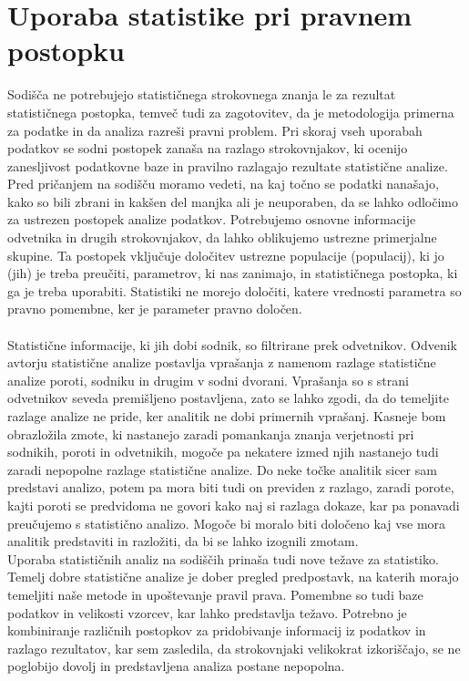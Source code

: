 \documentclass[12pt,a4paper]{amsart}
\theoremstyle{definition} %
\theoremstyle{plain} %
\begin{document}
\section{Uporaba statistike pri pravnem postopku}
Sodišča ne potrebujejo statističnega strokovnega znanja le za rezultat statističnega postopka, temveč tudi za zagotovitev, da je metodologija 
primerna za podatke in da analiza razreši pravni problem. Pri skoraj vseh uporabah podatkov se sodni postopek zanaša na razlago 
strokovnjakov, ki ocenijo zanesljivost podatkovne baze in pravilno razlagajo rezultate statistične analize. Pred pričanjem na sodišču moramo vedeti, 
na kaj točno se podatki nanašajo, kako so bili zbrani in kakšen del manjka ali je neuporaben, da se lahko odločimo za ustrezen postopek analize podatkov.
Potrebujemo osnovne informacije odvetnika in drugih strokovnjakov, da lahko oblikujemo ustrezne primerjalne skupine. Ta postopek vključuje 
določitev ustrezne populacije (populacij), ki jo (jih) je treba preučiti, parametrov, ki nas zanimajo, in statističnega postopka, ki ga je treba uporabiti. 
Statistiki ne morejo določiti, katere vrednosti parametra so pravno pomembne, ker je parameter pravno določen.\\\\
Statistične informacije, ki jih dobi sodnik, so filtrirane prek odvetnikov. Odvenik avtorju statistične analize postavlja vprašanja z namenom razlage 
statistične analize poroti, sodniku in drugim v sodni dvorani. Vprašanja so s strani odvetnikov seveda premišljeno postavljena, zato se lahko zgodi, da do 
temeljite razlage analize ne pride, ker analitik ne dobi primernih vprašanj. Kasneje bom obrazložila zmote, ki nastanejo zaradi pomankanja znanja verjetnosti 
pri sodnikih, poroti in odvetnikih, mogoče pa nekatere izmed njih nastanejo tudi zaradi nepopolne razlage statistične analize. Do neke točke analitik sicer sam 
predstavi analizo, potem pa mora biti tudi on previden z razlago, zaradi porote, kajti poroti se predvidoma ne govori kako naj si razlaga dokaze, kar pa ponavadi preučujemo 
s statistično analizo. Mogoče bi moralo biti določeno kaj vse mora analitik predstaviti in razložiti, da bi se lahko izognili zmotam.\\
Uporaba statističnih analiz na sodiščih prinaša tudi nove težave za statistiko. Temelj dobre statistične analize je dober pregled predpostavk, na 
katerih morajo temeljiti naše metode in upoštevanje pravil prava. Pomembne so tudi baze podatkov in velikosti vzorcev, kar lahko predstavlja težavo. 
Potrebno je kombiniranje različnih postopkov za pridobivanje informacij iz podatkov in razlago rezultatov, kar sem zasledila, da strokovnjaki velikokrat 
izkoriščajo, se ne poglobijo dovolj in predstavljena analiza postane nepopolna.
\end{document}
